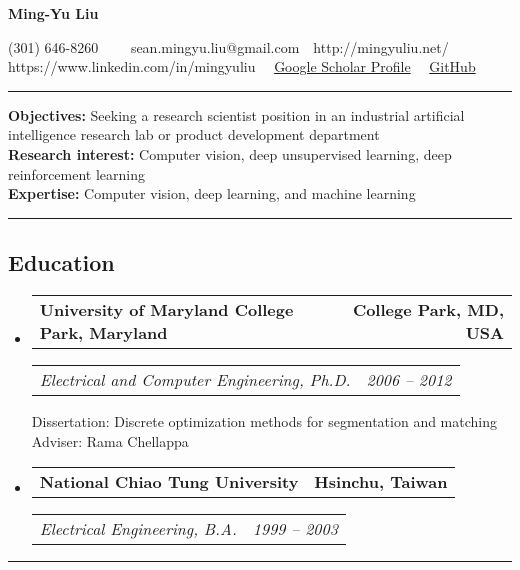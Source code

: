 \documentclass[10pt,letterpaper]{article}
\makeatletter
\newcommand{\headerrow}[2]
{\begin{tabular*}{\linewidth}{l@{\extracolsep{\fill}}r}
	#1 &
	#2 \\
\end{tabular*}}
\makeatother
\begin{document}
\begin{center}
{\LARGE \textbf{Ming-Yu Liu}}

(301) 646-8260\ \ \textbullet
\ \ sean.mingyu.liu@gmail.com\ \ \textbullet http://mingyuliu.net/
\\
https://www.linkedin.com/in/mingyuliu\ \ \textbullet 
\href{https://scholar.google.com/citations?hl=en&user=y-f-MZgAAAAJ&cstart=20&pagesize=20}{Google Scholar Profile}\ \ \textbullet 
\href{https://github.com/mingyuliutw}{GitHub}
\ \ 
\end{center}

\hrule
\vspace{0.2em}
$\quad$\\
{\bf Objectives:} Seeking a research scientist position in an industrial artificial intelligence research lab or product development department\\
{\bf Research interest:} Computer vision, deep unsupervised learning, deep reinforcement learning\\
{\bf Expertise:} Computer vision, deep learning, and machine learning\\\vspace{-2mm}


\hrule
\vspace{-0.4em}
\subsection*{Education}
\begin{itemize}
	\parskip=0.1em
	\item
	\headerrow
		{\textbf{University of Maryland College Park, Maryland}}
		{\textbf{College Park, MD, USA}}
	\headerrow
		{\emph{Electrical and Computer Engineering, Ph.D.}}
		{\emph{2006 -- 2012}}
		Dissertation: Discrete optimization methods for segmentation and matching\\
		Adviser: Rama Chellappa
	\item
	\headerrow
		{\textbf{National Chiao Tung University}}
		{\textbf{Hsinchu, Taiwan}}
	\headerrow
		{\emph{Electrical Engineering, B.A.}}
		{\emph{1999 -- 2003}}
\end{itemize}
\hrule
\vspace{-0.4em}
\end{document}
